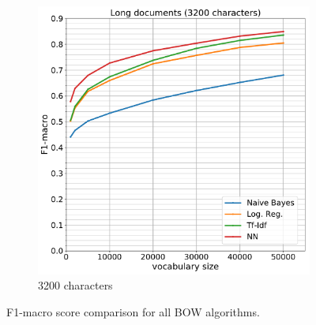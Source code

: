\begin{figure}
\begin{subfigure}[t]{.49\textwidth}
	\centering
	\includegraphics[width=0.99\linewidth]{img/05_bow_3200}
	\caption{3200 characters}
	\label{fig:05_bow_3200}
\end{subfigure}%

\caption{F1-macro score comparison for all BOW algorithms.}
\label{fig:bow}
\end{figure}


